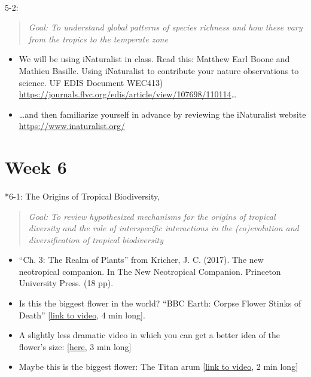 \documentclass[
  10pt,
  letterpaper,
  oneside,
  open=any]{scrbook}
\makeatletter
\let\oldparagraph\paragraph
\renewcommand{\paragraph}{
    \@ifstar
      \xxxParagraphStar
      \xxxParagraphNoStar
  }
\newcommand{\xxxParagraphStar}[1]{\oldparagraph*{#1}\mbox{}}
\newcommand{\xxxParagraphNoStar}[1]{\oldparagraph{#1}\mbox{}}
\makeatother
\begin{document}
\paragraph{5-2:}\label{section}

\begin{quote}
\emph{Goal: To understand global patterns of species richness and how
these vary from the tropics to the temperate zone}
\end{quote}

\begin{itemize}
\item
  We will be using iNaturalist in class. Read this: Matthew Earl Boone
  and Mathieu Basille. Using iNaturalist to contribute your nature
  observations to science. UF EDIS Document WEC413)
  \url{https://journals.flvc.org/edis/article/view/107698/110114}\ldots{}
\item
  \ldots and then familiarize yourself in advance by reviewing the
  iNaturalist website \url{https://www.inaturalist.org/}
\end{itemize}

\section*{Week 6}\label{week-6}


\paragraph*{6-1: The Origins of Tropical
Biodiversity,}\label{the-origins-of-tropical-biodiversity}

\begin{quote}
\emph{Goal: To review hypothesized mechanisms for the origins of
tropical diversity and the role of interspecific interactions in the
(co)evolution and diversification of tropical biodiversity}
\end{quote}

\begin{itemize}
\item
  ``Ch. 3: The Realm of Plants'' from Kricher, J. C. (2017). The new
  neotropical companion. In The New Neotropical Companion. Princeton
  University Press. (18 pp).
\item
  Is this the biggest flower in the world? ``BBC Earth: Corpse Flower
  Stinks of Death''
  {[}\href{https://www.youtube.com/watch?v=YxIpl38rsMo}{link to video},
  4 min long{]}.
\item
  A slightly less dramatic video in which you can get a better idea of
  the flower's size:
  {[}\href{https://www.youtube.com/watch?v=0cGRujABwuQ}{here}, 3 min
  long{]}
\item
  Maybe this is the biggest flower: The Titan arum
  {[}\href{https://www.youtube.com/watch?v=5Jg-GlCXpEI}{link to video},
  2 min long{]}
\end{itemize}
\end{document}
